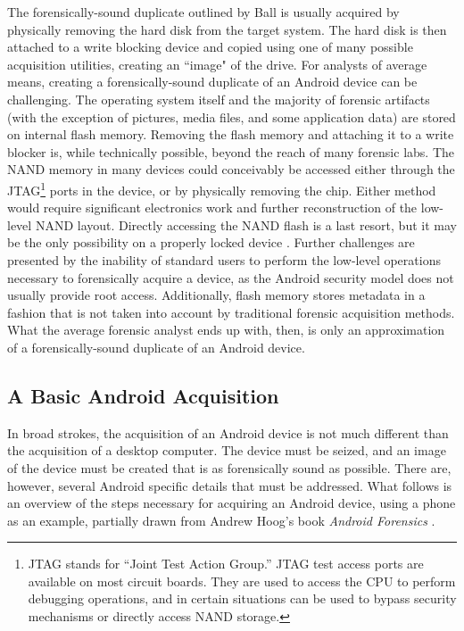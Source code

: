 The forensically-sound duplicate outlined by Ball is usually acquired by physically removing the hard disk from the target system.
The hard disk is then attached to a write blocking device and copied using one of many possible acquisition utilities, creating an
``image" of the drive. For analysts of average means, creating a forensically-sound duplicate of an Android device can be
challenging. The operating system itself and the majority of forensic artifacts (with the exception of pictures, media files, and
some application data) are stored on internal flash memory.  Removing the flash memory and attaching it to a write blocker is, while
technically possible, beyond the reach of many forensic labs.  The NAND memory in many devices could conceivably be accessed either
through the JTAG\footnote{JTAG stands for ``Joint Test Action Group.'' JTAG test access ports are available on most circuit boards.
They are used to access the CPU to perform debugging operations, and in certain situations can be used to bypass security mechanisms
or directly access NAND storage.} ports in the device, or by physically removing the chip.  Either method would require significant
electronics work and further reconstruction of the low-level NAND layout. Directly accessing the NAND flash is a last resort, but it
may be the only possibility on a properly locked device \cite{chipoff}.  Further challenges are presented by the inability of
standard users to perform the low-level operations necessary to forensically acquire a device, as the Android security model does
not usually provide root access.  Additionally, flash memory stores metadata in a fashion that is not taken into account by
traditional forensic acquisition methods.  What the average forensic analyst ends up with, then, is only an approximation of a
forensically-sound duplicate of an Android device. 

\subsection{A Basic Android Acquisition}

In broad strokes, the acquisition of an Android device is not much different than the acquisition of a desktop computer. 
The device must be seized, and an image of the device must be created that is as forensically sound as possible.  There are,
however, several Android specific details that must be addressed.  What follows is an overview of the steps necessary for acquiring
an Android device, using a phone as an example, partially drawn from Andrew Hoog's book \emph{Android Forensics} \cite{hoog}.

